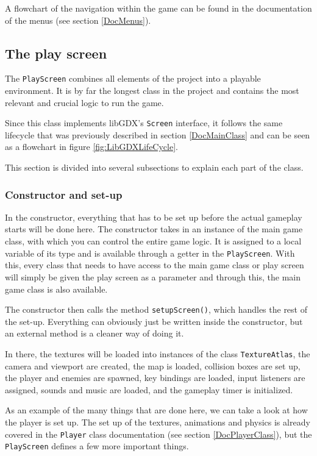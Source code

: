 \documentclass[12p]{article}
\begin{document}
A flowchart of the navigation within the game can be found in the documentation of the menus (see section \ref{DocMenus}).

 
 \newpage
\subsection{The play screen} \label{DocPlayScreen}

The \texttt{PlayScreen} combines all elements of the project into a playable environment. It is by far the longest class in the project and contains the most relevant and crucial logic to run the game.

Since this class implements libGDX's \texttt{Screen} interface, it follows the same lifecycle that was previously described in section \ref{DocMainClass} and can be seen as a flowchart in figure \ref{fig:LibGDXLifeCycle}. 

This section is divided into several subsections to explain each part of the class.
 
\subsubsection{Constructor and set-up}

In the constructor, everything that has to be set up before the actual gameplay starts will be done here. The constructor takes in an instance of the main game class, with which you can control the entire game logic. It is assigned to a local variable of its type and is available through a getter in the \texttt{PlayScreen}. With this, every class that needs to have access to the main game class or play screen will simply be given the play screen as a parameter and through this, the main game class is also available.

The constructor then calls the method \texttt{setupScreen()}, which handles the rest of the set-up. Everything can obviously just be written inside the constructor, but an external method is a cleaner way of doing it.

In there, the textures will be loaded into instances of the class \texttt{TextureAtlas}, the camera and viewport are created, the map is loaded, collision boxes are set up, the player and enemies are spawned, key bindings are loaded, input listeners are assigned, sounds and music are loaded, and the gameplay timer is initialized.

As an example of the many things that are done here, we can take a look at how the player is set up. The set up of the textures, animations and physics is already covered in the \texttt{Player} class documentation (see section \ref{DocPlayerClass}), but the \texttt{PlayScreen} defines a few more important things.
\end{document}

